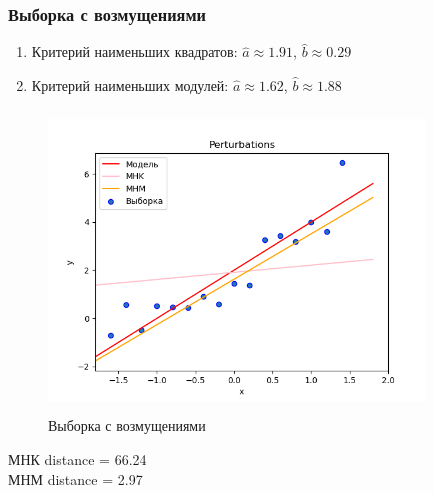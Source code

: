 	\subsubsection{Выборка с возмущениями}
		\begin{enumerate}
			\item{Критерий наименьших квадратов:}
			$\hat{a}\approx 1.91$, $\hat{b}\approx 0.29$
			\item{Критерий наименьших модулей:}
			$\hat{a}\approx 1.62$, $\hat{b}\approx 1.88$
		\end{enumerate}
		\begin{figure}[H]
			\centering
			\includegraphics[width = 10cm, height = 8cm]{pics/Perturbations.png}
			\caption{Выборка с возмущениями}
			\label{w_pert}
		\end{figure}
		МНК distance = 66.24 \\
		МНМ distance = 2.97

	
